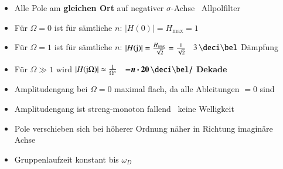 \begin{itemize}
    \item Alle Pole am \textbf{gleichen Ort} auf negativer $\sigma$-Achse \textrightarrow\ Allpolfilter
    \item Für $\Omega = 0$ ist für sämtliche $n$: $|H(0)| = H_{\max} = 1$
    \item Für $\Omega = 1$ ist für sämtliche $n$: $|H(\mathrm{j})| = \frac{H_{\max}}{\sqrt{2}} = \frac{1}{\sqrt{2}}$
        \textrightarrow\ $3 \, \deci \bel$ Dämpfung
    \item Für $\Omega \gg 1$ wird $|H(\mathrm{j} \Omega)| \approx \frac{1}{\Omega^n}$ \textrightarrow\ $\bm{- n \cdot 20 \, \deci \bel /}$ \textbf{Dekade}
    \item Amplitudengang bei $\Omega = 0$ maximal flach, da alle Ableitungen $=0$ sind
    \item Amplitudengang ist streng-monoton fallend \textrightarrow\ keine Welligkeit
    \item Pole verschieben sich bei höherer Ordnung näher in Richtung imaginäre Achse
    \item Gruppenlaufzeit konstant bis $\omega_D$
\end{itemize}



